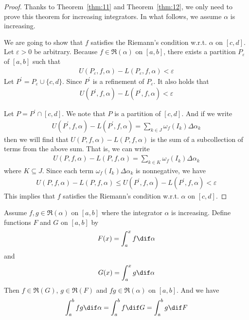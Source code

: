 \documentclass[thmcnt=section, color=blue, 12pt]{my-elegantbook}
\begin{document}
\begin{proof}
	Thanks to Theorem~\ref{thm:11} and Theorem~\ref{thm:12},
	we only need to prove this theorem for increasing integrators.
	In what follows, we assume $\alpha$ is increasing.

	We are going to show that $f$ satisfies the
	Riemann's condition w.r.t. $\alpha$ on $[c, d]$.
	Let $\varepsilon > 0$ be arbitrary.
	Because $f \in \mathfrak{R}(\alpha)$ on $[a, b]$,
	there exists a partition $P_\varepsilon$ of $[a, b]$
	such that
	\begin{align*}
		U(P_\varepsilon, f, \alpha) - L(P_\varepsilon, f, \alpha) < \varepsilon
	\end{align*}
	Let $P^\prime = P_\varepsilon \cup \{c, d\}$.
	Since $P^\prime$ is a refinement of $P_\varepsilon$.
	It also holds that
	\begin{align*}
		U(P^\prime, f, \alpha) - L(P^\prime, f, \alpha) < \varepsilon
	\end{align*}

	Let $P = P^\prime \cap [c, d]$.
	We note that $P$ is a partition of $[c, d]$.
	And if we write
	\begin{align*}
		U(P^\prime, f, \alpha) - L(P^\prime, f, \alpha)
		= \sum_{k \in J} \omega_f(I_k) \Delta \alpha_k
	\end{align*}
	then we will find that $U(P, f, \alpha) - L(P, f, \alpha)$ is
	the sum of a subcollection of terms from the above sum.
	That is, we can write
	\begin{align*}
		U(P, f, \alpha) - L(P, f, \alpha)
		= \sum_{k \in K} \omega_f(I_k) \Delta \alpha_k
	\end{align*}
	where $K \subseteq J$.
	Since each term $\omega_f(I_k) \Delta \alpha_k$ is nonnegative,
	we have
	\begin{align*}
		U(P, f, \alpha) - L(P, f, \alpha)
		\leq U(P^\prime, f, \alpha) - L(P^\prime, f, \alpha)
		< \varepsilon
	\end{align*}
	This implies that $f$ satisfies the Riemann's condition
	w.r.t. $\alpha$ on $[c, d]$.
\end{proof}

\begin{theorem}
	Assume $f, g \in \mathfrak{R}(\alpha)$ on $[a, b]$
	where the integrator $\alpha$ is increasing.
	Define functions $F$ and $G$ on $[a, b]$ by
	\begin{align*}
		F(x) = \int_a^x f \dif \alpha
	\end{align*}
	and
	\begin{align*}
		G(x) = \int_a^x g \dif \alpha
	\end{align*}
	Then $f \in \mathfrak{R}(G)$,  $g \in \mathfrak{R}(F)$
	and $fg \in \mathfrak{R}(\alpha)$ on $[a, b]$.
	And we have
	\begin{align*}
		\int_a^b f g \dif \alpha
		= \int_a^b f \dif G
		= \int_a^b g \dif F
	\end{align*}
\end{theorem}
\end{document}
